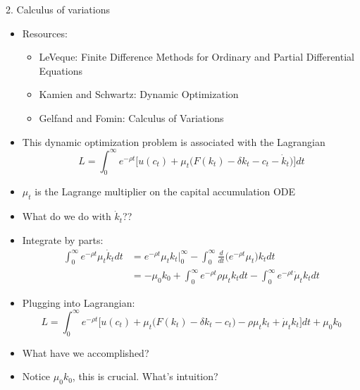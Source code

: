 \documentclass[10pt]{beamer}
\begin{document}
\begin{frame}{2. Calculus of variations}
\begin{itemize}
\item Resources:
\begin{itemize}
	\item LeVeque: Finite Difference Methods for Ordinary and Partial Differential Equations
	
	\item Kamien and Schwartz: Dynamic Optimization
	
	\item Gelfand and Fomin: Calculus of Variations
\end{itemize}

\item This dynamic optimization problem is associated with the Lagrangian
\begin{equation*}
	L = \int_0^\infty e^{-\rho t} \bigg[ u(c_t) + \mu_t \bigg( F(k_t) - \delta k_t - c_t - \dot k_t \bigg) \bigg] dt 
\end{equation*}

\item $\mu_t$ is the Lagrange multiplier on the capital accumulation ODE

\item What do we do with $\dot k_t$??

\end{itemize}
\end{frame}


\begin{frame}{}
\begin{itemize}		
\item Integrate by parts:
\begin{align*}
	\int_0^\infty e^{-\rho t} \mu_t \dot k_t dt &= e^{-\rho t} \mu_t k_t \Big|_0^\infty - \int_0^\infty \frac{d}{dt} \bigg( e^{-\rho t} \mu_t \bigg) k_t dt \\
	&= - \mu_0 k_0 + \int_0^\infty e^{-\rho t} \rho \mu_t k_t dt - \int_0^\infty e^{-\rho t} \dot \mu_t k_t dt
\end{align*}

\item Plugging into Lagrangian: 
\begin{equation*}
	L = \int_0^\infty e^{-\rho t} \bigg[ u(c_t) + \mu_t \bigg( F(k_t) - \delta k_t - c_t \bigg) - \rho \mu_t k_t + \dot \mu_t k_t \bigg] dt + \mu_0 k_0
\end{equation*}

\item What have we accomplished? 

\item Notice $\mu_0 k_0$, this is crucial. What's intuition? 

\end{itemize}
\end{frame}
\end{document}
